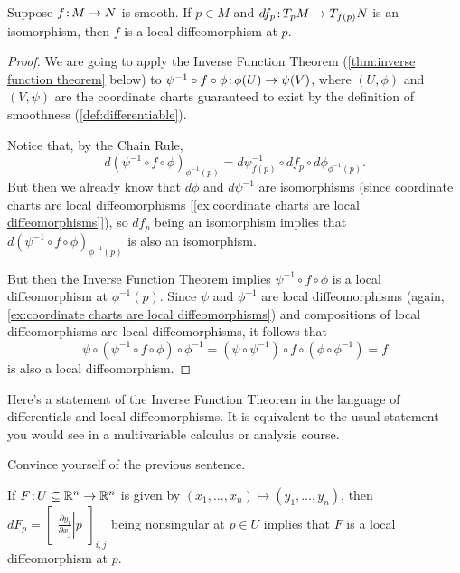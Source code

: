 \begin{proposition}\label{prop:local diffeomorphism}
	Suppose $f \colon\thinspace\!\! M \to N$ is smooth. If $p \in M$ and $df_p \colon\thinspace\!\! T_p M \to T_{f(p)}N$ is an isomorphism, then $f$ is a local diffeomorphism at $p$.
\end{proposition}

\begin{proof}
	We are going to apply the Inverse Function Theorem (\cref{thm:inverse function theorem} below) to $\psi^{-1} \circ f \circ \phi \colon\thinspace\!\! \phi(U) \to \psi(V)$, where $(U,\phi)$ and $(V, \psi)$ are the coordinate charts guaranteed to exist by the definition of smoothness (\cref{def:differentiable}).
	
	Notice that, by the Chain Rule,
	\[
		d(\psi^{-1} \circ f \circ \phi)_{\phi^{-1}(p)} = d\psi^{-1}_{f(p)} \circ df_p \circ d\phi_{\phi^{-1}(p)}.
	\]
	But then we already know that $d\phi$ and $d\psi^{-1}$ are isomorphisms (since coordinate charts are local diffeomorphisms [\cref{ex:coordinate charts are local diffeomorphisms}]), so $df_p$ being an isomorphism implies that $d(\psi^{-1} \circ f \circ \phi)_{\phi^{-1}(p)}$ is also an isomorphism.
	
	But then the Inverse Function Theorem implies $\psi^{-1} \circ f \circ \phi$ is a local diffeomorphism at $\phi^{-1}(p)$. Since $\psi$ and $\phi^{-1}$ are local diffeomorphisms (again, \cref{ex:coordinate charts are local diffeomorphisms}) and compositions of local diffeomorphisms are local diffeomorphisms, it follows that
	\[
		\psi \circ (\psi^{-1} \circ f \circ \phi) \circ \phi^{-1} = (\psi \circ \psi^{-1}) \circ f \circ (\phi \circ \phi^{-1}) = f
	\]
	is also a local diffeomorphism.
\end{proof}

Here's a statement of the Inverse Function Theorem in the language of differentials and local diffeomorphisms. It is equivalent to the usual statement you would see in a multivariable calculus or analysis course.

\begin{exercise}
	Convince yourself of the previous sentence.
\end{exercise}

\begin{theorem}\label{thm:inverse function theorem}
	If $F \colon\thinspace\!\! U \subseteq \mathbb{R}^n \to \mathbb{R}^n$ is given by $(x_1, \dots , x_n) \mapsto (y_1, \dots , y_n)$, then $dF_p = \begin{bmatrix} \left.\frac{\partial y_i}{\partial x_j}\right|p\end{bmatrix}_{i,j}$ being nonsingular at $p \in U$ implies that $F$ is a local diffeomorphism at $p$.
\end{theorem}

